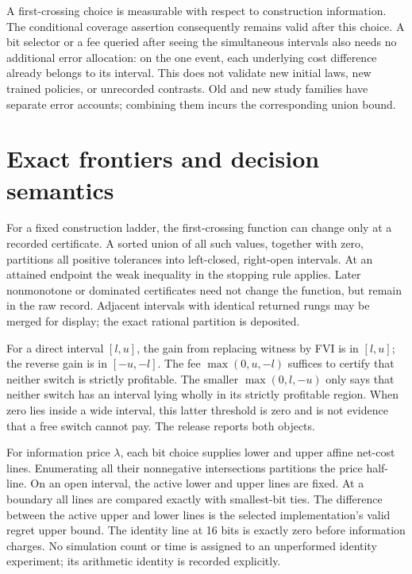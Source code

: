 \documentclass[ecta,nameyear,draft]{econsocart}
\begin{document}
A first-crossing choice is measurable with respect to construction information. The conditional coverage assertion consequently remains valid after this choice. A bit selector or a fee queried after seeing the simultaneous intervals also needs no additional error allocation: on the one event, each underlying cost difference already belongs to its interval. This does not validate new initial laws, new trained policies, or unrecorded contrasts. Old and new study families have separate error accounts; combining them incurs the corresponding union bound.

\section{Exact frontiers and decision semantics}\label{supp:frontiers49}
For a fixed construction ladder, the first-crossing function can change only at a recorded certificate. A sorted union of all such values, together with zero, partitions all positive tolerances into left-closed, right-open intervals. At an attained endpoint the weak inequality in the stopping rule applies. Later nonmonotone or dominated certificates need not change the function, but remain in the raw record. Adjacent intervals with identical returned rungs may be merged for display; the exact rational partition is deposited.

For a direct interval $[l,u]$, the gain from replacing witness by FVI is in $[l,u]$; the reverse gain is in $[-u,-l]$. The fee $\max(0,u,-l)$ suffices to certify that neither switch is strictly profitable. The smaller $\max(0,l,-u)$ only says that neither switch has an interval lying wholly in its strictly profitable region. When zero lies inside a wide interval, this latter threshold is zero and is not evidence that a free switch cannot pay. The release reports both objects.

For information price $\lambda$, each bit choice supplies lower and upper affine net-cost lines. Enumerating all their nonnegative intersections partitions the price half-line. On an open interval, the active lower and upper lines are fixed. At a boundary all lines are compared exactly with smallest-bit ties. The difference between the active upper and lower lines is the selected implementation's valid regret upper bound. The identity line at 16 bits is exactly zero before information charges. No simulation count or time is assigned to an unperformed identity experiment; its arithmetic identity is recorded explicitly.



\end{document}
